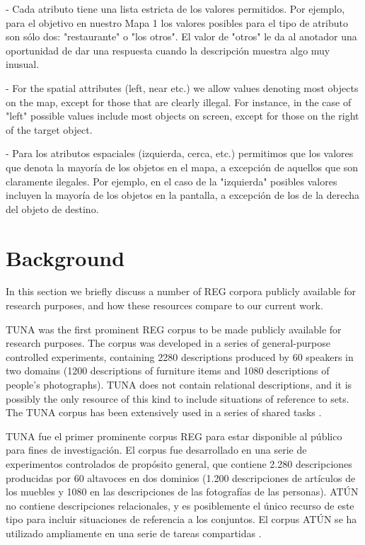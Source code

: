 - Cada atributo tiene una lista estricta de los valores permitidos. Por ejemplo, para el objetivo en nuestro Mapa 1 los valores posibles para el tipo de atributo son s\'olo dos: "restaurante" o "los otros". El valor de "otros" le da al anotador una oportunidad de dar una respuesta cuando la descripci\'on muestra algo muy inusual.


- For the spatial attributes (left, near etc.) we allow values denoting most objects on the map, except for those that are clearly illegal. For instance, in the case of "left" possible values include most objects on screen, except for those on the right of the target object.

- Para los atributos espaciales (izquierda, cerca, etc.) permitimos que los valores que denota la mayor\'{i}a de los objetos en el mapa, a excepci\'on de aquellos que son claramente ilegales. Por ejemplo, en el caso de la "izquierda" posibles valores incluyen la mayor\'{i}a de los objetos en la pantalla, a excepci\'on de los de la derecha del objeto de destino.
\section{Background}
\label{sec-background}

In this section we briefly discuss a number of REG corpora publicly available for research purposes, and how these resources compare to our current work.

TUNA \cite{tuna-corpus} was the first prominent REG corpus to be made publicly available for research purposes. The corpus was developed in a series of general-purpose controlled experiments, containing 2280 descriptions produced by 60 speakers in two domains (1200 descriptions of furniture items and 1080 descriptions of people's photographs). TUNA does not contain relational descriptions, and it is possibly the only resource of this kind to include situations of reference to sets. The TUNA corpus has been extensively used in a series of shared tasks \cite{reg2009}.

TUNA \cite{tuna-corpus} fue el primer prominente corpus REG para estar disponible al p\'ublico para fines de investigaci\'on. El corpus fue desarrollado en una serie de experimentos controlados de prop\'osito general, que contiene 2.280 descripciones producidas por 60 altavoces en dos dominios (1.200 descripciones de art\'{i}culos de los muebles y 1080 en las descripciones de las fotograf\'{i}as de las personas). AT\'UN no contiene descripciones relacionales, y es posiblemente el \'unico recurso de este tipo para incluir situaciones de referencia a los conjuntos. El corpus AT\'UN se ha utilizado ampliamente en una serie de tareas compartidas \cite{reg2009}.



